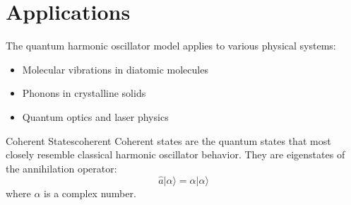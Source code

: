 \documentclass[12pt,a4paper]{article}
\begin{document}
\section{Applications}

The quantum harmonic oscillator model applies to various physical systems:

\begin{itemize}
    \item Molecular vibrations in diatomic molecules
    \item Phonons in crystalline solids
    \item Quantum optics and laser physics
\end{itemize}

\begin{definition}{Coherent States}{coherent}
Coherent states are the quantum states that most closely resemble classical harmonic oscillator behavior. They are eigenstates of the annihilation operator:
\[ \hat{a}|\alpha\rangle = \alpha|\alpha\rangle \]
where $\alpha$ is a complex number.
\end{definition}


\end{document}
